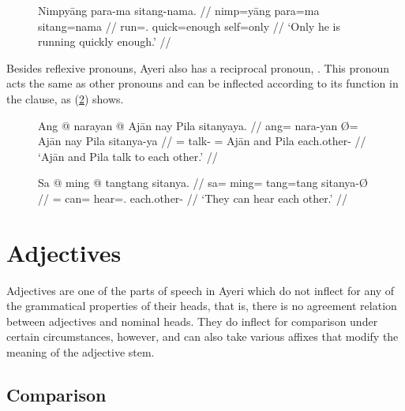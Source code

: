 \begin{figure}
\ex\label{ex:sitangqtorder}%
\begingl
	\gla Nimpyāng para-ma sitang-nama. //
	\glb nimp=yāng para=ma sitang=nama //
	\glc run=\TsgM{}.\Aarg{} quick=enough self=only //
	\glft `Only he is running quickly enough.' //
\endgl\xe
\end{figure}


Besides reflexive pronouns, Ayeri also has a reciprocal pronoun,
. This pronoun acts the same as other pronouns
and can be inflected according to its function in the clause, as
(\ref{ex:recippro}) shows.

\begin{figure}
\pex\label{ex:recippro}
\a\begingl
	\gla Ang @ narayan {} @ Ajān nay Pila sitanyaya. //
	\glb ang= nara-yan Ø= Ajān nay Pila sitanya-ya //
	\glc \AgtT{}= talk-\TplM{} \Top{}= Ajān and Pila each.other-\Loc{} //
	\glft `Ajān and Pila talk to each other.' //
\endgl

\a\begingl
	\gla Sa @ ming @ tangtang sitanya. //
	\glb sa= ming= tang=tang sitanya-Ø //
	\glc \PatT{}= can= hear=\TplM{}.\Aarg{} each.other-\Top{} //
	\glft `They can hear each other.' //
\endgl
\xe
\end{figure}


\section{Adjectives}
\label{sec:adjectives}

Adjectives are one of the parts of speech in Ayeri which do not inflect for any
of the grammatical properties of their heads, that is, there is no agreement
relation between adjectives and nominal heads. They do inflect for comparison
under certain circumstances, however, and can also take various affixes that
modify the meaning of the adjective stem.

\subsection{Comparison}
\label{subsec:adjcomp}


